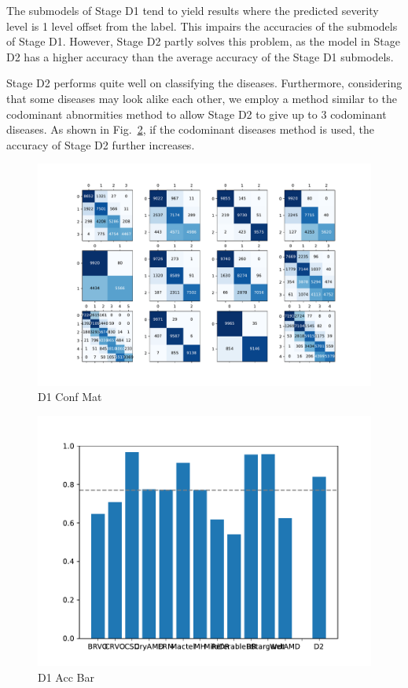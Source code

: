 \documentclass{article}
\begin{document}
	The submodels of Stage D1 tend to yield results where the predicted severity level is 1 level offset from the label. This impairs the accuracies of the submodels of Stage D1. However, Stage D2 partly solves this problem, as the model in Stage D2 has a higher accuracy than the average accuracy of the Stage D1 submodels. 
	
	Stage D2 performs quite well on classifying the diseases. Furthermore, considering that some diseases may look alike each other, we employ a method similar to the codominant abnormities method to allow Stage D2 to give up to 3 codominant diseases. As shown in Fig.~\ref{fig:D1_acc_bar}, if the codominant diseases method is used, the accuracy of Stage D2 further increases. 
	
	\begin{figure}[htbp]
		\centering
		\includegraphics[width=\linewidth]{Figs/diagnosis1_confusion_matrix.pdf}
		\caption{D1 Conf Mat}
		\vspace{0.3cm}
		\label{fig:D1_conf_mat}
	\end{figure}
	
	\begin{figure}[htbp]
		\centering
		\includegraphics[width=\linewidth]{Figs/diagnosis1_acc_barchart.pdf}
		\caption{D1 Acc Bar}
		\vspace{0.3cm}
		\label{fig:D1_acc_bar}
	\end{figure}
	
\end{document}
